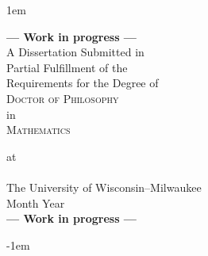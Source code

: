 \thispagestyle{empty}
\vs \vs \vs
\openup 1em
\begin{center}
	\mytitle
	\vs
	\textbf{--- Work in progress ---}\\
	A Dissertation Submitted in \\
	Partial Fulfillment of the \\
	Requirements for the Degree of \\
	\vs \vs
	\textsc{Doctor of Philosophy} \\
	in \\
	\textsc{Mathematics} 
	\vs \vs

	at\\
	 \ \\
	The University of Wisconsin--Milwaukee\\ 
	Month Year\\
	\textbf{--- Work in progress ---}\\
\end{center}
\openup -1em
\pagebreak
